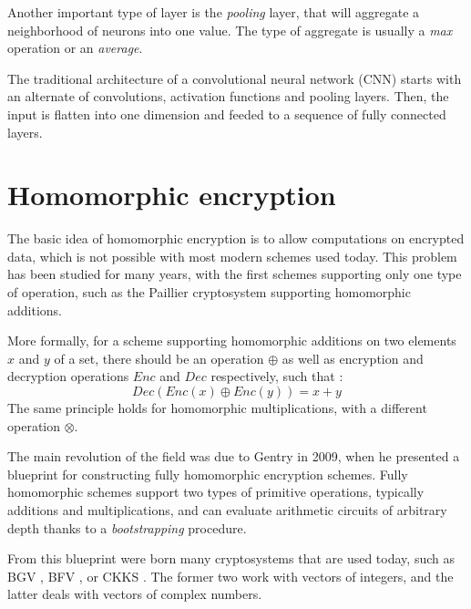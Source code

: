 \documentclass[a4paper,11pt,oneside]{report}
\begin{document}
Another important type of layer is the \emph{pooling} layer, that will aggregate a neighborhood of neurons into one value. 
The type of aggregate is usually a \emph{max} operation or an \emph{average}.

The traditional architecture of a convolutional neural network (CNN) starts with an alternate of convolutions, activation functions and pooling layers. 
Then, the input is flatten into one dimension and feeded to a sequence of fully connected layers.


\section{Homomorphic encryption}

The basic idea of homomorphic encryption is to allow computations on encrypted data, which is not possible with most modern schemes used today. 
This problem has been studied for many years, with the first schemes supporting only one type of operation, such as the Paillier \cite{paillier_public-key_1999} cryptosystem supporting homomorphic additions. 

More formally, for a scheme supporting homomorphic additions on two elements $x$ and $y$ of a set, there should be an operation $\oplus$ as well as encryption and decryption operations $Enc$ and $Dec$ respectively, such that : 
\begin{equation}\label{eq:homomorphic_add}
  Dec(Enc(x) \oplus Enc(y)) = x + y
\end{equation}
The same principle holds for homomorphic multiplications, with a different operation $\otimes$.

The main revolution of the field was due to Gentry \cite{gentry_fully_2009} in 2009, when he presented a blueprint for constructing fully homomorphic encryption schemes. 
Fully homomorphic schemes support two types of primitive operations, typically additions and multiplications, and can evaluate arithmetic circuits of arbitrary depth thanks to a \emph{bootstrapping} procedure.

From this blueprint were born many cryptosystems that are used today, such as BGV \cite{brakerski_leveled_2012}, BFV \cite{fan_somewhat_2012}, or CKKS \cite{cheon_homomorphic_2016, cheon_full_2018}. 
The former two work with vectors of integers, and the latter deals with vectors of complex numbers.
\end{document}

